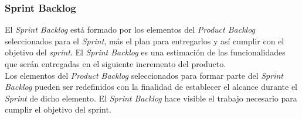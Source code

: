 \subsubsection{Sprint Backlog}
    
 El {\it Sprint Backlog} está formado por los elementos del {\it Product Backlog} seleccionados
 para el {\it Sprint}, más el plan para entregarlos y así cumplir con el objetivo del {\it sprint}.
 El {\it Sprint Backlog} es una estimación de las funcionalidades que serán entregadas en el siguiente
 incremento del producto.\\

 \noindent Los elementos del {\it Product Backlog} seleccionados para formar parte del {\it Sprint Backlog}
 pueden ser redefinidos con la finalidad de establecer el alcance durante el {\it Sprint} de dicho elemento.
 El {\it Sprint Backlog} hace visible el trabajo necesario para cumplir el objetivo del sprint.

\clearpage
